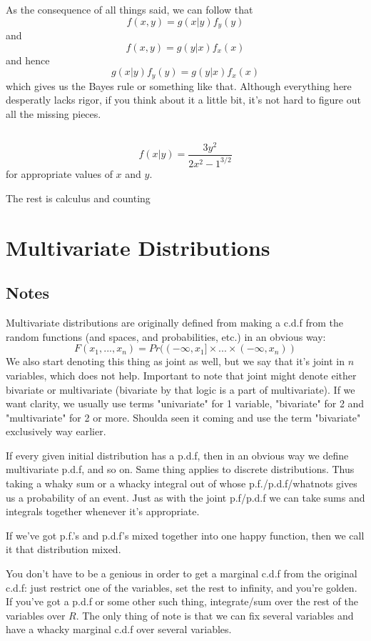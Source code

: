 \documentclass[11pt,oneside,titlepage]{book}
\begin{document}
As the consequence of all things said, we can follow that
$$f(x, y) = g(x|y) f_y(y)$$
and
$$f(x, y) = g(y|x) f_x(x)$$
and hence
$$g(x|y) f_y(y) = g(y|x) f_x(x)$$
which gives us the Bayes rule or something like that. Although
everything here desperatly lacks rigor, if you think about it a little
bit, it's not hard to figure out all the missing pieces.

\subsection{}

$$f(x|y) = \frac{3y^2}{2{x^2 - 1}^{3/2}}$$
for appropriate values of $x$ and $y$.

The rest is calculus and counting

\section{Multivariate Distributions}

\subsection*{Notes}

Multivariate distributions are originally defined from making a c.d.f
from the random functions (and spaces, and probabilities, etc.) in an
obvious way:
$$F(x_1, ..., x_n) = Pr((-\infty, x_1] \times ... \times (-\infty, x_n))$$
We also start denoting this thing as joint as well, but we say that
it's joint in $n$ variables, which does not help. Important to note
that joint might denote either bivariate or multivariate (bivariate by
that logic is a part of multivariate). If we want clarity, we usually
use terms "univariate" for 1 variable, "bivariate" for 2 and
"multivariate" for 2 or more. Shoulda seen it coming and use the
term "bivariate" exclusively way earlier.


If every given initial distribution has a p.d.f, then in an obvious
way we define multivariate p.d.f, and so on. Same thing applies to
discrete distributions. Thus taking a whaky sum or a whacky integral
out of whose p.f./p.d.f/whatnots gives us a probability of an event.
Just as with the joint p.f/p.d.f we can take sums and integrals
together whenever it's appropriate.

If we've got p.f.'s and p.d.f's mixed together into one happy function,
then we call it that distribution mixed.

You don't have to be a genious in order to get a marginal c.d.f from
the original c.d.f: just restrict one of the variables, set the rest
to infinity, and you're golden. If you've got a p.d.f or some other
such thing, integrate/sum over the rest of the variables over $R$.
The only thing of note is that we can fix several variables and have a
whacky marginal c.d.f over several variables. 
\end{document}
